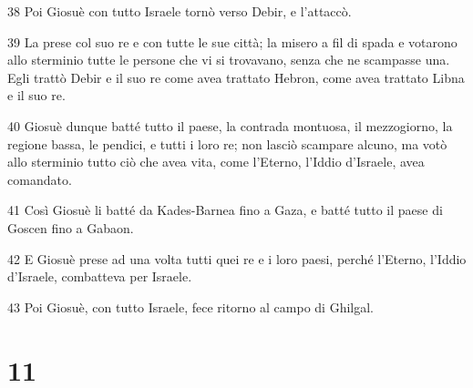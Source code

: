 \par 38 Poi Giosuè con tutto Israele tornò verso Debir, e l'attaccò.
\par 39 La prese col suo re e con tutte le sue città; la misero a fil di spada e votarono allo sterminio tutte le persone che vi si trovavano, senza che ne scampasse una. Egli trattò Debir e il suo re come avea trattato Hebron, come avea trattato Libna e il suo re.
\par 40 Giosuè dunque batté tutto il paese, la contrada montuosa, il mezzogiorno, la regione bassa, le pendici, e tutti i loro re; non lasciò scampare alcuno, ma votò allo sterminio tutto ciò che avea vita, come l'Eterno, l'Iddio d'Israele, avea comandato.
\par 41 Così Giosuè li batté da Kades-Barnea fino a Gaza, e batté tutto il paese di Goscen fino a Gabaon.
\par 42 E Giosuè prese ad una volta tutti quei re e i loro paesi, perché l'Eterno, l'Iddio d'Israele, combatteva per Israele.
\par 43 Poi Giosuè, con tutto Israele, fece ritorno al campo di Ghilgal.

\chapter{11}


